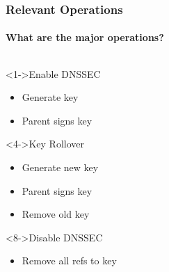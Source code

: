 \documentclass{beamer}
\begin{document}
\begin{frame}
  \frametitle{Relevant Operations}
  \framesubtitle{What are the major operations?}

  \begin{columns}[c]
    \begin{column}{4.8cm}
      \begin{block}<1->{Enable DNSSEC}
        \begin{itemize}
        \item Generate key
        \item Parent signs key
        \end{itemize}
      \end{block}

      \begin{block}<4->{Key Rollover}
        \begin{itemize}
        \item Generate new key
        \item Parent signs key
        \item Remove old key
        \end{itemize}
      \end{block}

      \begin{block}<8->{Disable DNSSEC}
        \begin{itemize}
        \item Remove \alert{all} refs to key
        \end{itemize}
      \end{block}

    \end{column}


  \end{columns}

\end{frame}
\end{document}
